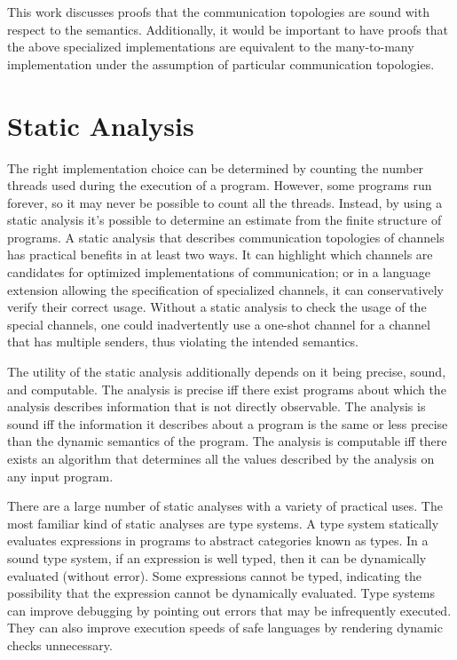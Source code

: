\documentclass{article}
\begin{document}
This work discusses proofs that the communication topologies are sound with respect to the
semantics. Additionally, it would be important to have proofs that the above specialized
implementations are equivalent to the many-to-many implementation under the assumption of
particular communication topologies.

\section{Static Analysis}
The right implementation choice can be determined by counting the number threads used during
the execution of a program. However, some programs run forever, so it may never be possible to
count all the threads. Instead, by using a static analysis it's possible to determine an
estimate from the finite structure of programs. A static analysis that describes communication
topologies of channels has practical benefits in at least two ways.  It can highlight which
channels are candidates for optimized implementations of communication; or in a language
extension allowing the specification of specialized channels, it can conservatively verify
their correct usage. Without a static analysis to check the usage of the special channels, one
could inadvertently use a one-shot channel for a channel that has multiple senders, thus
violating the intended semantics. 

The utility of the static analysis additionally depends on it being precise, sound, and
computable. The analysis is precise iff there exist programs about which the analysis
describes information that is not directly observable. The analysis is sound iff the
information it describes about a program is the same or less precise than the dynamic
semantics of the program. The analysis is computable iff there exists an algorithm that
determines all the values described by the analysis on any input program.

There are a large number of static analyses with a variety of practical uses. The most familiar
kind of static analyses are type systems.  A type system statically evaluates expressions
in programs to abstract categories known as types. In a sound type system, if an expression is
well typed, then it can be dynamically evaluated (without error). Some expressions cannot be
typed, indicating the possibility that the expression cannot be dynamically evaluated. Type
systems can improve debugging by pointing out errors that may be infrequently executed. They
can also improve execution speeds of safe languages by rendering dynamic checks unnecessary.  
\end{document}
